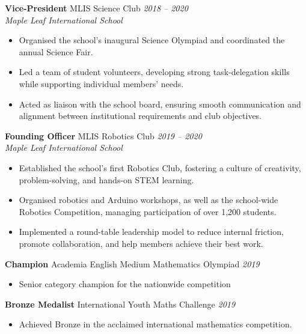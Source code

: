 \documentclass[10pt,a4paper]{article}
\newenvironment{project}{
    \begin{itemize}[leftmargin=3ex, rightmargin=2ex, noitemsep, labelsep=1.2mm, itemsep=0mm, topsep=0mm]\small
}{
    \end{itemize}
}
\begin{document}
\textbf{Vice-President} \textbar{} MLIS Science Club \hfill \textit{2018 -- 2020}\\
\noindent\textit{Maple Leaf International School}
\begin{project}
    \item Organised the school’s inaugural Science Olympiad and coordinated the annual Science Fair.
    \item Led a team of student volunteers, developing strong task-delegation skills while supporting individual members’ needs.
    \item Acted as liaison with the school board, ensuring smooth communication and alignment between institutional requirements and club objectives.
\end{project}
\vspace{2mm}

\textbf{Founding Officer} \textbar{} MLIS Robotics Club \hfill \textit{2019 -- 2020}\\
\noindent\textit{Maple Leaf International School}
\begin{project}
    \item Established the school’s first Robotics Club, fostering a culture of creativity, problem-solving, and hands-on STEM learning.
    \item Organised robotics and Arduino workshops, as well as the school-wide Robotics Competition, managing participation of over 1,200 students.
    \item Implemented a round-table leadership model to reduce internal friction, promote collaboration, and help members achieve their best work.
\end{project}
\vspace{2mm}

\textbf{Champion} \textbar{} Academia English Medium Mathematics Olympiad \hfill \textit{2019}
\begin{project}
    \item Senior category champion for the nationwide competition
\end{project}
\vspace{2mm}

\textbf{Bronze Medalist} \textbar{} International Youth Maths Challenge \hfill \textit{2019}
\begin{project}
    \item Achieved Bronze in the acclaimed international mathematics competition.
\end{project}
\vspace{2mm}
\end{document}
